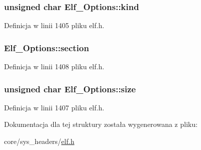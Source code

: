 \hypertarget{struct_elf___options_a3732e1185baf21c513ee7618d334d8c5}{
\subsubsection[{kind}]{\setlength{\rightskip}{0pt plus 5cm}unsigned char Elf\-\_\-\-Options\-::kind}}\label{struct_elf___options_a3732e1185baf21c513ee7618d334d8c5}


Definicja w linii 1405 pliku elf.\-h.

\hypertarget{struct_elf___options_a87449701f0810aa950517897da8ad747}{
\subsubsection[{section}]{ Elf\-\_\-\-Options\-::section}}\label{struct_elf___options_a87449701f0810aa950517897da8ad747}


Definicja w linii 1408 pliku elf.\-h.

\hypertarget{struct_elf___options_a9a66f1e3a53f76858d3520f151864744}{
\subsubsection[{size}]{\setlength{\rightskip}{0pt plus 5cm}unsigned char Elf\-\_\-\-Options\-::size}}\label{struct_elf___options_a9a66f1e3a53f76858d3520f151864744}


Definicja w linii 1407 pliku elf.\-h.



Dokumentacja dla tej struktury została wygenerowana z pliku\-:\begin{DoxyCompactItemize}
\item 
core/sys\-\_\-headers/\hyperlink{elf_8h}{elf.\-h}\end{DoxyCompactItemize}
